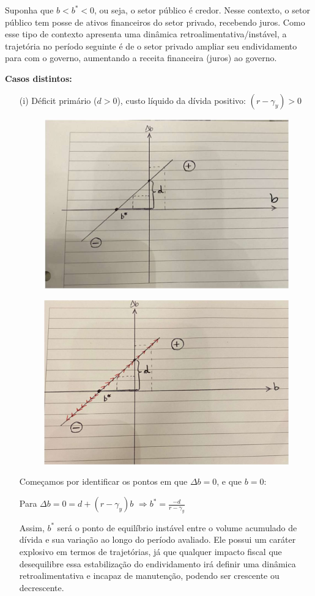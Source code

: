 \documentclass[a4paper,12pt]{article}[abntex2]
\begin{document}
Suponha que $b < b^* < 0$, ou seja, o setor público é credor. Nesse contexto, o setor público tem posse de ativos financeiros do setor privado, recebendo juros. Como esse tipo de contexto apresenta uma dinâmica retroalimentativa/instável, a trajetória no período seguinte é de o setor privado ampliar seu endividamento para com o governo, aumentando a receita financeira (juros) ao governo.

\textbf{Casos distintos:}
\begin{itemize}
  \item[(i)] Déficit primário ($d > 0$), custo líquido da dívida positivo: $(r - \gamma_y) > 0$
\begin{figure}[H]
    \centering
    \includegraphics[width=0.7\linewidth]{Imagens/a18i5.png}
\end{figure}
  \begin{figure}[H]
    \centering
    \includegraphics[width=0.7\linewidth]{Imagens/a18i6.png}
\end{figure}

Começamos por identificar os pontos em que \(\Delta b = 0\), e que \(b = 0\):

Para \(\Delta b = 0 = d + (r - \gamma_y)b\) \(\Rightarrow b^* = \frac{-d}{r - \gamma_y}\)

Assim, \(b^*\) será o ponto de equilíbrio instável entre o volume acumulado de dívida e sua variação ao longo do período avaliado. 
Ele possui um caráter explosivo em termos de trajetórias, já que qualquer impacto fiscal que desequilibre essa estabilização do endividamento 
irá definir uma dinâmica retroalimentativa e incapaz de manutenção, podendo ser crescente ou decrescente.


\end{itemize}
\end{document}
